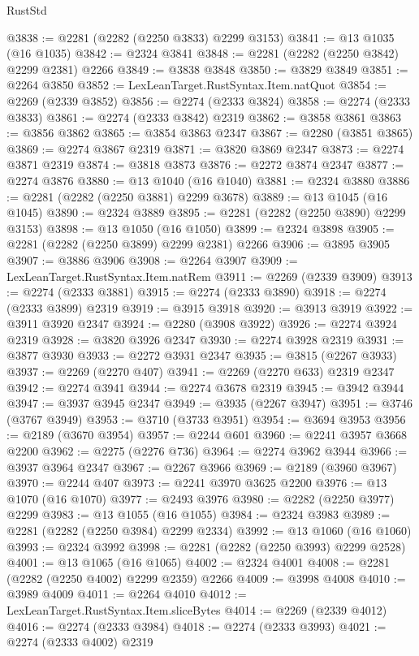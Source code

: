 \begin{lexlean}{RustStd}
\begin{coremodule}
@3838 := @2281 (@2282 (@2250 @3833) @2299 @3153)
@3841 := @13 @1035 (@16 @1035)
@3842 := @2324 @3841
@3848 := @2281 (@2282 (@2250 @3842) @2299 @2381) @2266
@3849 := @3838 @3848
@3850 := @3829 @3849
@3851 := @2264 @3850
@3852 := LexLeanTarget.RustSyntax.Item.natQuot
@3854 := @2269 (@2339 @3852)
@3856 := @2274 (@2333 @3824)
@3858 := @2274 (@2333 @3833)
@3861 := @2274 (@2333 @3842) @2319
@3862 := @3858 @3861
@3863 := @3856 @3862
@3865 := @3854 @3863 @2347
@3867 := @2280 (@3851 @3865)
@3869 := @2274 @3867 @2319
@3871 := @3820 @3869 @2347
@3873 := @2274 @3871 @2319
@3874 := @3818 @3873
@3876 := @2272 @3874 @2347
@3877 := @2274 @3876
@3880 := @13 @1040 (@16 @1040)
@3881 := @2324 @3880
@3886 := @2281 (@2282 (@2250 @3881) @2299 @3678)
@3889 := @13 @1045 (@16 @1045)
@3890 := @2324 @3889
@3895 := @2281 (@2282 (@2250 @3890) @2299 @3153)
@3898 := @13 @1050 (@16 @1050)
@3899 := @2324 @3898
@3905 := @2281 (@2282 (@2250 @3899) @2299 @2381) @2266
@3906 := @3895 @3905
@3907 := @3886 @3906
@3908 := @2264 @3907
@3909 := LexLeanTarget.RustSyntax.Item.natRem
@3911 := @2269 (@2339 @3909)
@3913 := @2274 (@2333 @3881)
@3915 := @2274 (@2333 @3890)
@3918 := @2274 (@2333 @3899) @2319
@3919 := @3915 @3918
@3920 := @3913 @3919
@3922 := @3911 @3920 @2347
@3924 := @2280 (@3908 @3922)
@3926 := @2274 @3924 @2319
@3928 := @3820 @3926 @2347
@3930 := @2274 @3928 @2319
@3931 := @3877 @3930
@3933 := @2272 @3931 @2347
@3935 := @3815 (@2267 @3933)
@3937 := @2269 (@2270 @407)
@3941 := @2269 (@2270 @633) @2319 @2347
@3942 := @2274 @3941
@3944 := @2274 @3678 @2319
@3945 := @3942 @3944
@3947 := @3937 @3945 @2347
@3949 := @3935 (@2267 @3947)
@3951 := @3746 (@3767 @3949)
@3953 := @3710 (@3733 @3951)
@3954 := @3694 @3953
@3956 := @2189 (@3670 @3954)
@3957 := @2244 @601
@3960 := @2241 @3957 @3668 @2200
@3962 := @2275 (@2276 @736)
@3964 := @2274 @3962 @3944
@3966 := @3937 @3964 @2347
@3967 := @2267 @3966
@3969 := @2189 (@3960 @3967)
@3970 := @2244 @407
@3973 := @2241 @3970 @3625 @2200
@3976 := @13 @1070 (@16 @1070)
@3977 := @2493 @3976
@3980 := @2282 (@2250 @3977) @2299
@3983 := @13 @1055 (@16 @1055)
@3984 := @2324 @3983
@3989 := @2281 (@2282 (@2250 @3984) @2299 @2334)
@3992 := @13 @1060 (@16 @1060)
@3993 := @2324 @3992
@3998 := @2281 (@2282 (@2250 @3993) @2299 @2528)
@4001 := @13 @1065 (@16 @1065)
@4002 := @2324 @4001
@4008 := @2281 (@2282 (@2250 @4002) @2299 @2359) @2266
@4009 := @3998 @4008
@4010 := @3989 @4009
@4011 := @2264 @4010
@4012 := LexLeanTarget.RustSyntax.Item.sliceBytes
@4014 := @2269 (@2339 @4012)
@4016 := @2274 (@2333 @3984)
@4018 := @2274 (@2333 @3993)
@4021 := @2274 (@2333 @4002) @2319

\end{coremodule}
\end{lexlean}
